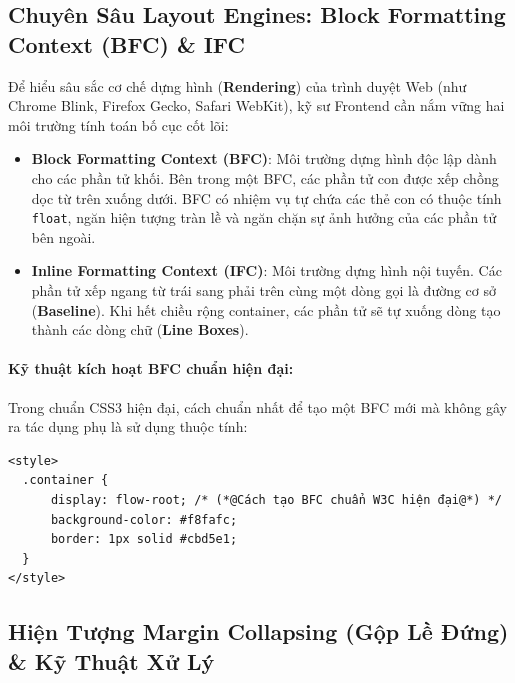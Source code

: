 \documentclass[11pt,oneside]{book}
\newcommand{\codeinline}[1]{\textcolor{accentOrange}{\texttt{#1}}}
\newcommand{\term}[1]{\textbf{\textcolor{primaryBlue}{#1}}}
\begin{document}
\Needspace*{80pt}
\subsection{Chuyên Sâu Layout Engines: Block Formatting Context (BFC) \& IFC}

Để hiểu sâu sắc cơ chế dựng hình (\term{Rendering}) của trình duyệt Web (như Chrome Blink, Firefox Gecko, Safari WebKit), kỹ sư Frontend cần nắm vững hai môi trường tính toán bố cục cốt lõi:

\begin{itemize}[leftmargin=1.8em, itemsep=3pt, parsep=0pt]
    \item \textbf{Block Formatting Context (BFC)}: Môi trường dựng hình độc lập dành cho các phần tử khối. Bên trong một BFC, các phần tử con được xếp chồng dọc từ trên xuống dưới. BFC có nhiệm vụ tự chứa các thẻ con có thuộc tính \codeinline{float}, ngăn hiện tượng tràn lề và ngăn chặn sự ảnh hưởng của các phần tử bên ngoài.
    \item \textbf{Inline Formatting Context (IFC)}: Môi trường dựng hình nội tuyến. Các phần tử xếp ngang từ trái sang phải trên cùng một dòng gọi là đường cơ sở (\term{Baseline}). Khi hết chiều rộng container, các phần tử sẽ tự xuống dòng tạo thành các dòng chữ (\term{Line Boxes}).
\end{itemize}

\paragraph{Kỹ thuật kích hoạt BFC chuẩn hiện đại:}
Trong chuẩn CSS3 hiện đại, cách chuẩn nhất để tạo một BFC mới mà không gây ra tác dụng phụ là sử dụng thuộc tính:
\begin{codeWindow}
\begin{lstlisting}[language=HTML5]
<style>
  .container {
      display: flow-root; /* (*@Cách tạo BFC chuẩn W3C hiện đại@*) */
      background-color: #f8fafc;
      border: 1px solid #cbd5e1;
  }
</style>
\end{lstlisting}
\end{codeWindow}

\Needspace*{80pt}
\subsection{Hiện Tượng Margin Collapsing (Gộp Lề Đứng) \& Kỹ Thuật Xử Lý}
\end{document}
